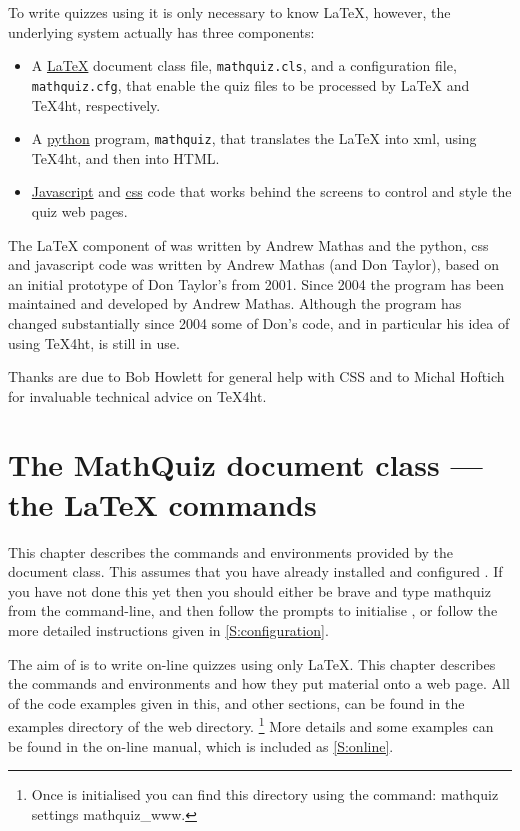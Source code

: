 \documentclass[svgnames]{article}
\newcommand\ddash{\texttt{\textemdash\textemdash}}
\newcommand\mathquizopt[1]{\textsf{mathquiz \ddash#1}}
\begin{document}
    To write quizzes using \MathQuiz it is only necessary to know
    \LaTeX, however, the underlying \MathQuiz system actually has three components:
    \begin{itemize}
      \item A \href{https://www.latex-project.org/}{\LaTeX} document class file, \texttt{mathquiz.cls}, and
      a  configuration file, \texttt{mathquiz.cfg}, that enable the
      quiz files to be processed by \LaTeX{} and \TeX 4ht, respectively.
      \item A \href{https://www.python.org/}{python} program, \texttt{mathquiz}, that translates the
      \LaTeX{} into xml, using \TeX 4ht, and then into HTML.
      \item \href{https://www.w3schools.com/Js/}{Javascript} and \href{https://www.w3schools.com/css/}{css}
      code that works behind the screens to control and style the quiz web pages.
    \end{itemize}

   The \LaTeX{} component of \MathQuiz{} was written by Andrew Mathas
   and the python, css and javascript code was written by Andrew Mathas
   (and Don Taylor), based on an initial prototype of Don Taylor's from
   2001.  Since 2004 the program has been maintained and developed by
   Andrew Mathas. Although the program has changed substantially since
   2004 some of Don's code, and in particular his idea of using
   \TeX4ht, is still in use.

   Thanks are due to Bob Howlett for general help with CSS and to
   Michal Hoftich for invaluable technical advice on \TeX4ht.

 \section{The MathQuiz document class --- the \LaTeX{} commands}\label{S:documentclass}

  This chapter describes the commands and environments provided by the
  \MathQuiz document class. This assumes that you have already installed
  and configured \MathQuiz. If you have not done this yet then you
  should either be brave and type \textsf{mathquiz} from the
  command-line, and then follow the prompts to initialise \MathQuiz, or
  follow the more detailed instructions given in
  \autoref{S:configuration}.

  The aim of \MathQuiz is to write on-line quizzes using only \LaTeX.
  This chapter describes the \MathQuiz commands and environments and how
  they put material onto a web page.  All of the code examples given in
  this, and other sections, can be found in the \textsf{examples}
  directory of the \MathQuiz web directory.%
  \footnote{Once \MathQuiz is initialised you can find this directory
  using the command: \mathquizopt{settings mathquiz\_www}.}
  More details and some examples can be found in the on-line manual,
  which is included as \autoref{S:online}.
\end{document}
